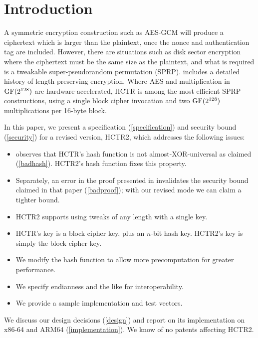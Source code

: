 \documentclass[hctr2.tex]{subfiles}
\begin{document}
\section{Introduction}
A symmetric encryption construction such as AES-GCM\cite{gcm}
will produce a ciphertext which is larger than
the plaintext, once the nonce and authentication tag are included. However,
there are situations such as disk sector encryption
where the ciphertext must be the same size as the
plaintext, and what is required is a tweakable
super-pseudorandom permutation\cite{cmc} (SPRP). 
\cite{adiantum} includes a detailed history of length-preserving encryption.
Where AES and multiplication in \(\operatorname{GF}(2^{128})\) are hardware-accelerated,
HCTR\cite{hctr} is among the most efficient 
SPRP constructions, using
a single block cipher invocation and two \(\operatorname{GF}(2^{128})\) multiplications
per 16-byte block.

In this paper, we present 
a specification (\autoref{specification})
and security bound (\autoref{security})
for a revised version, HCTR2, which 
addresses the following issues:
\begin{itemize}
    \item \cite{kumarhctr} observes that HCTR's hash function
    is not almost-XOR-universal\cite{eadu} as claimed (\autoref{badhash}).
    HCTR2's hash function fixes this property.
    \item Separately,
    an error in the proof presented in \cite{hctrquad}
    invalidates the security bound claimed in that paper (\autoref{badproof}); with our revised
    mode we can claim a tighter bound.
    \item HCTR2 supports using tweaks of any length with a single key.
    \item HCTR's key is a block cipher key, plus an \(n\)-bit
    hash key. HCTR2's key is simply
    the block cipher key.
    \item We modify the hash function to allow more precomputation
    for greater performance.
    \item We specify endianness and the like for interoperability.
    \item We provide a sample implementation and test vectors.
\end{itemize}
We discuss our design decisions (\autoref{design})
and report on its implementation on x86-64 and ARM64 (\autoref{implementation}).
We know of no patents affecting HCTR2.

\end{document}
